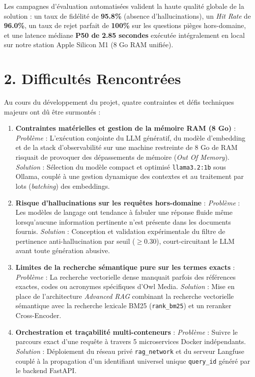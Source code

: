 Les campagnes d'évaluation automatisées valident la haute qualité globale de la solution : un taux de fidélité de \textbf{95.8\%} (absence d'hallucinations), un \textit{Hit Rate} de \textbf{96.0\%}, un taux de rejet parfait de \textbf{100\%} sur les questions pièges hors-domaine, et une latence médiane \textbf{P50 de 2.85 secondes} exécutée intégralement en local sur notre station Apple Silicon M1 (8 Go RAM unifiée).

\section*{2. Difficultés Rencontrées}
Au cours du développement du projet, quatre contraintes et défis techniques majeurs ont dû être surmontés :
\begin{enumerate}
    \item \textbf{Contraintes matérielles et gestion de la mémoire RAM (8 Go)} :  
    \textit{Problème} : L'exécution conjointe du LLM génératif, du modèle d'embedding et de la stack d'observabilité sur une machine restreinte de 8 Go de RAM risquait de provoquer des dépassements de mémoire (\textit{Out Of Memory}).  
    \textit{Solution} : Sélection du modèle compact et optimisé \texttt{llama3.2:1b} sous Ollama, couplé à une gestion dynamique des contextes et au traitement par lots (\textit{batching}) des embeddings.
    \item \textbf{Risque d'hallucinations sur les requêtes hors-domaine} :  
    \textit{Problème} : Les modèles de langage ont tendance à fabuler une réponse fluide même lorsqu'aucune information pertinente n'est présente dans les documents fournis.  
    \textit{Solution} : Conception et validation expérimentale du filtre de pertinence anti-hallucination par seuil ($\ge 0.30$), court-circuitant le LLM avant toute génération abusive.
    \item \textbf{Limites de la recherche sémantique pure sur les termes exacts} :  
    \textit{Problème} : La recherche vectorielle dense manquait parfois des références exactes, codes ou acronymes spécifiques d'Owl Media.  
    \textit{Solution} : Mise en place de l'architecture \textit{Advanced RAG} combinant la recherche vectorielle sémantique avec la recherche lexicale BM25 (\texttt{rank\_bm25}) et un reranker Cross-Encoder.
    \item \textbf{Orchestration et traçabilité multi-conteneurs} :  
    \textit{Problème} : Suivre le parcours exact d'une requête à travers 5 microservices Docker indépendants.  
    \textit{Solution} : Déploiement du réseau privé \texttt{rag\_network} et du serveur Langfuse couplé à la propagation d'un identifiant universel unique \texttt{query\_id} généré par le backend FastAPI.
\end{enumerate}

